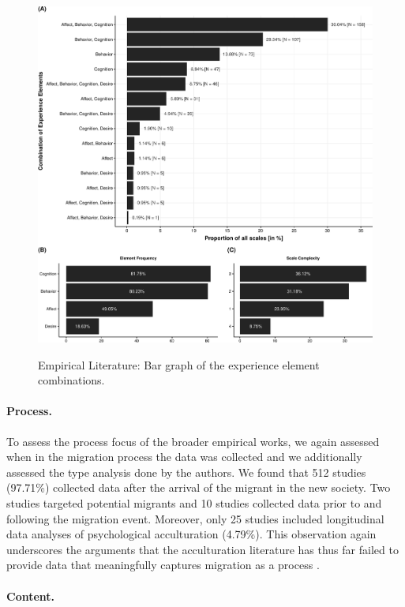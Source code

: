 \begin{figure}[h]
\centering
\caption{Empirical Literature: Bar graph of the experience element combinations.}
\includegraphics[width=\textwidth]{Figures/EmpPlotFreq-1}
\label{fig:EmpPlotFreq-1}
\end{figure}

\paragraph{Process.}

To assess the process focus of the broader empirical works, we again
assessed when in the migration process the data was collected and we
additionally assessed the type analysis done by the authors. We found
that 512 studies (97.71\%) collected data after the arrival of the
migrant in the new society. Two studies targeted potential migrants and
10 studies collected data prior to and following the migration event.
Moreover, only 25 studies included longitudinal data analyses of
psychological acculturation (4.79\%). This observation again underscores
the arguments that the acculturation literature has thus far failed to
provide data that meaningfully captures migration as a process
\citep[e.g.,][]{Brown2011, Ward2019}.

\color{blue}
\paragraph{Content.}

